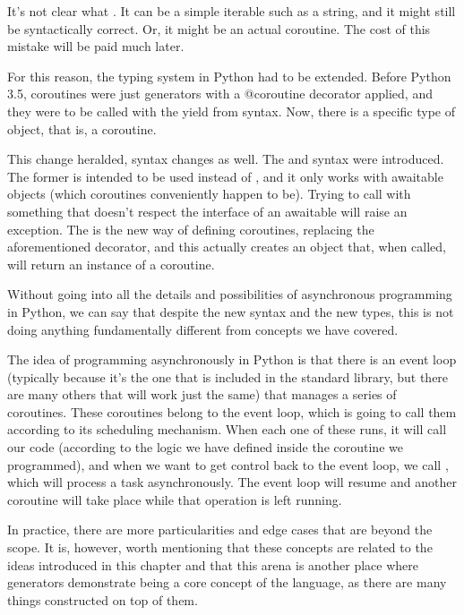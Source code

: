 \documentclass[a4paper,10pt,english]{sphinxmanual}
\begin{document}
It’s not clear what . It can be a simple iterable such as a
string, and it might still be syntactically correct. Or, it might be an actual coroutine. The cost
of this mistake will be paid much later.

For this reason, the typing system in Python had to be extended. Before Python 3.5,
coroutines were just generators with a @coroutine decorator applied, and they were to be
called with the yield from syntax. Now, there is a specific type of object, that is, a
coroutine.

This change heralded, syntax changes as well. The  and  syntax were
introduced. The former is intended to be used instead of , and it only works
with awaitable objects (which coroutines conveniently happen to be). Trying to
call  with something that doesn’t respect the interface of an awaitable will raise an
exception. The  is the new way of defining coroutines, replacing the
aforementioned decorator, and this actually creates an object that, when called, will return
an instance of a coroutine.

Without going into all the details and possibilities of asynchronous programming in
Python, we can say that despite the new syntax and the new types, this is not doing
anything fundamentally different from concepts we have covered.

The idea of programming asynchronously in Python is that there is an event loop
(typically  because it’s the one that is included in the standard library, but there
are many others that will work just the same) that manages a series of coroutines. These
coroutines belong to the event loop, which is going to call them according to its scheduling
mechanism. When each one of these runs, it will call our code (according to the logic we
have defined inside the coroutine we programmed), and when we want to get control back
to the event loop, we call , which will process a task asynchronously.
The event loop will resume and another coroutine will take place while that operation is left
running.

In practice, there are more particularities and edge cases that are beyond the scope. It is, however, worth
mentioning that these concepts are related to the ideas introduced in this chapter and that this arena is
another place where generators demonstrate being a core concept of the language, as there are many things
constructed on top of them.
\end{document}
